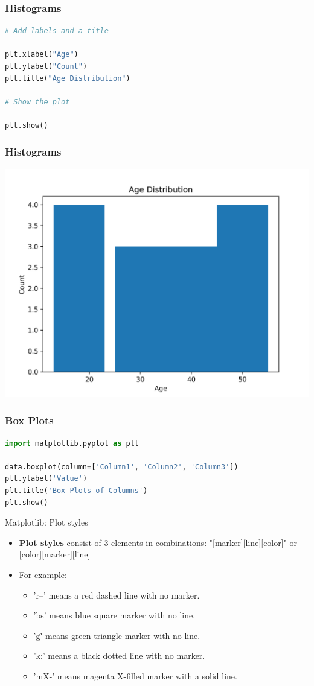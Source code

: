\documentclass{beamer}
\begin{document}
    \begin{frame}[fragile]
        \frametitle{Histograms}
        \begin{lstlisting}[language=Python]
# Add labels and a title

plt.xlabel("Age")
plt.ylabel("Count")
plt.title("Age Distribution")

# Show the plot

plt.show()
        \end{lstlisting}
    \end{frame}

    \begin{frame}
        \frametitle{Histograms}
        \begin{center}
            \includegraphics[width=0.7\linewidth]{figures/histogram_example_custom}
        \end{center}
    \end{frame}

    \begin{frame}[fragile]
        \frametitle{Box Plots}
        \begin{lstlisting}[language=Python]
import matplotlib.pyplot as plt

data.boxplot(column=['Column1', 'Column2', 'Column3'])
plt.ylabel('Value')
plt.title('Box Plots of Columns')
plt.show()
        \end{lstlisting}
    \end{frame}

    \begin{frame}[fragile]{Matplotlib: Plot styles}
        \begin{itemize}
            \item \textbf{Plot styles} consist of 3 elements in combinations: "[marker][line][color]" or [color][marker][line]
            \item For example:
            \begin{itemize}
                \item 'r--' means a red dashed line with no marker.
                \item 'bs' means blue square marker with no line.
                \item 'g\^' means green triangle marker with no line.
                \item 'k:' means a black dotted line with no marker.
                \item 'mX-' means magenta X-filled marker with a solid line.
            \end{itemize}
        \end{itemize}
    \end{frame}
\end{document}
